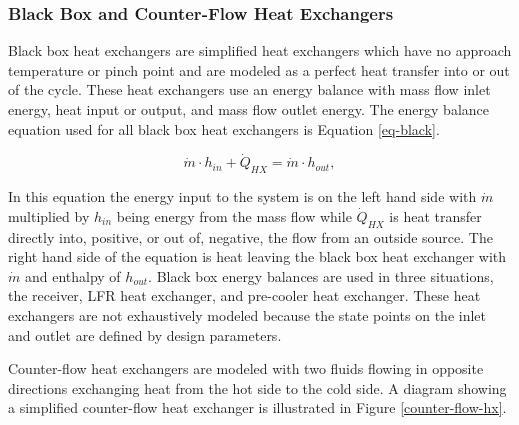 \subsubsection{Black Box and Counter-Flow Heat Exchangers}
Black box heat exchangers are simplified heat exchangers which have no approach temperature or pinch point and are modeled as a perfect heat transfer into or out of the cycle. These heat exchangers use an energy balance with mass flow inlet energy, heat input or output, and mass flow outlet energy. The energy balance equation used for all black box heat exchangers is Equation \ref{eq-black}.


\begin{equation}
    \label{eq-black}
    \dot{m} \cdot h_{in} + \dot{Q}_{HX} = \dot{m} \cdot h_{out} ,
\end{equation}

In this equation the energy input to the system is on the left hand side with $\dot{m}$ multiplied by $h_{in}$ being energy from the mass flow while $\dot{Q}_{HX}$ is heat transfer directly into, positive, or out of, negative, the flow from an outside source. The right hand side of the equation is heat leaving the black box heat exchanger with $\dot{m}$ and enthalpy of $h_{out}$. Black box energy balances are used in three situations, the receiver, LFR heat exchanger, and pre-cooler heat exchanger. These heat exchangers are not exhaustively modeled because the state points on the inlet and outlet are defined by design parameters.

Counter-flow heat exchangers are modeled with two fluids flowing in opposite directions exchanging heat from the hot side to the cold side.  A diagram showing a simplified counter-flow heat exchanger is illustrated in Figure \ref{counter-flow-hx}.

